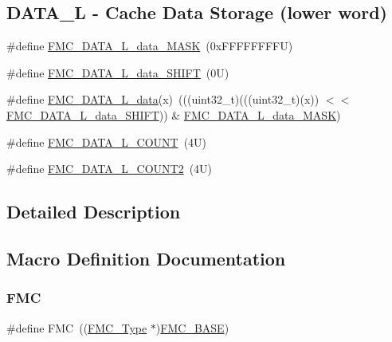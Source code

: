 \subsection*{D\+A\+T\+A\+\_\+L -\/ Cache Data Storage (lower word)}
\begin{DoxyCompactItemize}
\item 
\#define \mbox{\hyperlink{group___f_m_c___register___masks_gaefcb45152ed3dc9c4ac7b353f4eab44b}{F\+M\+C\+\_\+\+D\+A\+T\+A\+\_\+\+L\+\_\+data\+\_\+\+M\+A\+SK}}~(0x\+F\+F\+F\+F\+F\+F\+F\+F\+U)
\item 
\#define \mbox{\hyperlink{group___f_m_c___register___masks_gabef8366f6d036877a0600a2594f08bfb}{F\+M\+C\+\_\+\+D\+A\+T\+A\+\_\+\+L\+\_\+data\+\_\+\+S\+H\+I\+FT}}~(0\+U)
\item 
\#define \mbox{\hyperlink{group___f_m_c___register___masks_ga10e9daea84fd57e92170db3aedf7610a}{F\+M\+C\+\_\+\+D\+A\+T\+A\+\_\+\+L\+\_\+data}}(x)~(((uint32\+\_\+t)(((uint32\+\_\+t)(x)) $<$$<$ \mbox{\hyperlink{group___f_m_c___register___masks_gabef8366f6d036877a0600a2594f08bfb}{F\+M\+C\+\_\+\+D\+A\+T\+A\+\_\+\+L\+\_\+data\+\_\+\+S\+H\+I\+FT}})) \& \mbox{\hyperlink{group___f_m_c___register___masks_gaefcb45152ed3dc9c4ac7b353f4eab44b}{F\+M\+C\+\_\+\+D\+A\+T\+A\+\_\+\+L\+\_\+data\+\_\+\+M\+A\+SK}})
\item 
\#define \mbox{\hyperlink{group___f_m_c___register___masks_gac85beeab7f9a4a34780955e18d3cbec1}{F\+M\+C\+\_\+\+D\+A\+T\+A\+\_\+\+L\+\_\+\+C\+O\+U\+NT}}~(4\+U)
\item 
\#define \mbox{\hyperlink{group___f_m_c___register___masks_ga37e494c57a2ec472154a5d25a7de94ea}{F\+M\+C\+\_\+\+D\+A\+T\+A\+\_\+\+L\+\_\+\+C\+O\+U\+N\+T2}}~(4\+U)
\end{DoxyCompactItemize}


\subsection{Detailed Description}


\subsection{Macro Definition Documentation}
\mbox{\label{group___f_m_c___register___masks_ga970254e6dadedc433f57d43709636664}} 
\subsubsection{\texorpdfstring{F\+MC}{FMC}}
{\footnotesize\ttfamily \#define F\+MC~((\mbox{\hyperlink{struct_f_m_c___type}{F\+M\+C\+\_\+\+Type}} $\ast$)\mbox{\hyperlink{group___f_m_c___register___masks_ga68a39e11ba4a19785d20a98954c7fc9e}{F\+M\+C\+\_\+\+B\+A\+SE}})}

